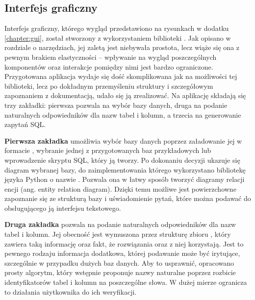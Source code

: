 \subsection{Interfejs graficzny}
Interfejs graficzny, którego wygląd przedstawiono na rysunkach w dodatku \ref{chapter:gui}, został stworzony z wykorzystaniem biblioteki . Jak opisano w rozdziale o narzędziach, jej zaletą jest niebywała prostota, lecz wiąże się ona z pewnym brakiem elastyczności -- wpływanie na wygląd poszczególnych komponentów oraz interakcje pomiędzy nimi jest bardzo ograniczone. Przygotowana aplikacja wydaje się dość skomplikowana jak na możliwości tej biblioteki, lecz po dokładnym przemyśleniu struktury i szczegółowym zapoznaniem z dokumentacją, udało się ją zrealizować. Na aplikację składają się trzy zakładki: pierwsza pozwala na wybór bazy danych, druga na podanie naturalnych odpowiedników dla nazw tabel i kolumn, a trzecia na generowanie zapytań SQL.

\textbf{Pierwsza zakładka} umożliwia wybór bazy danych poprzez załadowanie jej w formacie , wybranie jednej z przygotowanych baz przykładowych lub wprowadzenie skryptu SQL, który ją tworzy. Po dokonaniu decyzji ukazuje się diagram wybranej bazy, do zaimplementowania którego wykorzystano bibliotekę języka Python o nazwie . Pozwala ona w łatwy sposób tworzyć diagramy relacji encji (ang. entity relation diagram). Dzięki temu możliwe jest powierzchowne zapoznanie się ze strukturą bazy i uświadomienie pytań, które można podawać do obsługującego ją interfejsu tekstowego.

\textbf{Druga zakładka} pozwala na podanie naturalnych odpowiedników dla nazw tabel i kolumn. Jej obecność jest wymuszona przez strukturę zbioru , który zawiera taką informację oraz fakt, że rozwiązania  oraz  z niej korzystają. Jest to pewnego rodzaju informacja dodatkowa, której podawanie może być irytujące, szczególnie w przypadku dużych baz danych. Aby to usprawnić, opracowano prosty algorytm, który wstępnie proponuje nazwy naturalne poprzez rozbicie identyfikatorów tabel i kolumn na poszczególne słowa. W dużej mierze ogranicza to działania użytkownika do ich weryfikacji.

